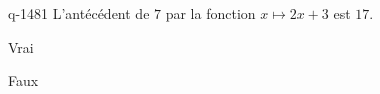 \begin{truefalse}{q-1481}
L'antécédent de $7$ par la fonction $x\mapsto 2x+3$ est $17$.
\item Vrai
\item* Faux
\end{truefalse}

